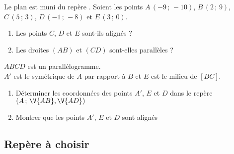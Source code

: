 \begin{multicols}{2}





\begin{exo}
 Le plan est muni du rep\`ere \Oij. Soient les points $A\,(-9\,;\,-10)$, $B\,(2\,;\,9)$, $C\,(5\,;\,3)$, $D\,(-1\,;\,-8)$ et $E\,(3\,;\,0)$.
\begin{enumerate}
 \item Les points $C$, $D$ et $E$ sont-ils align\'es ?
  \item Les droites $(AB)$ et $(CD)$ sont-elles parall\`eles ?
\end{enumerate}
\end{exo}



\begin{exo}
 $ABCD$ est un parall\'elogramme.\\
 $A'$ est le sym\'etrique de $A$ par rapport \`a $B$ et $E$ est le milieu de $[BC]$.
\begin{enumerate}
  \item D\'eterminer les coordonn\'ees des points $A'$, $E$ et $D$ dans le rep\`ere $\left(A\,;\,\V{AB},\V{AD}\right)$
 \item Montrer que les points $A'$, $E$ et $D$ sont align\'es
\end{enumerate}

\end{exo}

\end{multicols}


\subsection{Rep\`ere \`a choisir}

